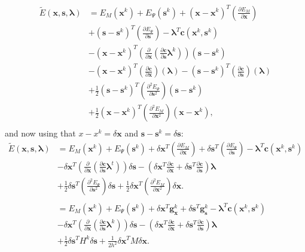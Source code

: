 \documentclass[letterpaper,12pt]{article}
\theoremstyle{remark}
\newcommand{\x}{\mathbf{x}}
\newcommand{\C}{\mathbf{c}}
\newcommand{\s}{\mathbf{s}}
\newcommand{\la}{\mathbf{\lambda}}
\newcommand{\dx}{\delta \x}
\newcommand{\ds}{\delta \s}
\newcommand{\gx}{ {\mathbf{g}_\x^k} }
\newcommand{\gs}{ {\mathbf{g}_\s^k} }
\begin{document}
\begin{equation}
\begin{split}
\tilde{E}(\x,\s,\la) &=  E_M(\x^k) + E_\Psi(\s^k) + 
(\x - \x^k)^T \left(\frac{\partial E_M}{\partial \x} \right)  \\
&+ (\s - \s^k)^T \left(\frac{\partial E_\Psi}{\partial \s} \right)   
 - \la^T \C (\x^k, \s^k) \\
& - (\x - \x^k)^T \left(
  \frac{\partial}{\partial \x} \left(\frac{\partial \C}{\partial \s} \la^k\right) \right)(\s - \s^k) \\
& - (\x - \x^k)^T \left(
  \frac{\partial \C }{\partial \x} \right)(\la) 
- (\s - \s^k)^T \left(
  \frac{\partial \C }{\partial \s} \right)(\la) \\
& + \frac{1}{2}(\s- \s^k)^T \left(\frac{\partial^2 E_\Psi}{\partial \s^2} \right)(\s - \s^k) \\
& + \frac{1}{2}(\x- \x^k)^T \left(\frac{\partial^2 E_M}{\partial \x^2}
\right)(\x - \x^k), \\
\end{split}
\end{equation}
and now using that $x - x^k = \dx$ and $\s - \s^k = \ds$:
\begin{equation}
\begin{split}
\tilde{E}(\x,\s,\la) &=  E_M(\x^k) + E_\Psi(\s^k) + 
\dx^T \left(\frac{\partial E_M}{\partial \x} \right) 
+ \ds^T \left(\frac{\partial E_\Psi}{\partial \s} \right)   
 - \la^T \C (\x^k, \s^k) \\
& - \dx^T \left(
  \frac{\partial}{\partial \x} \left(\frac{\partial \C}{\partial \s} \la^t\right) \right)\ds
- \left( \dx^T 
  \frac{\partial \C }{\partial \x}
+  \ds^T  
  \frac{\partial \C }{\partial \s} \right) \la \\
&+ \frac{1}{2}\ds^T \left(\frac{\partial^2 E_\Psi}{\partial \s^2} \right)\ds
+ \frac{1}{2} \dx^T \left(\frac{\partial^2 E_M}{\partial \x^2}
\right)\dx. \\
&\\
&=  E_M(\x^k) + E_\Psi(\s^k) + 
\dx^T \gx
+ \ds^T \gs
 - \la^T \C (\x^k, \s^k) \\
& - \dx^T \left(
  \frac{\partial}{\partial \x} \left(\frac{\partial \C}{\partial \s} \la^k\right) \right)\ds
- \left( \dx^T 
  \frac{\partial \C }{\partial \x}
+  \ds^T  
  \frac{\partial \C }{\partial \s} \right) \la \\
& + \frac{1}{2}\ds^T H^k \ds
+ \frac{1}{2h^2} \dx^T M \dx. \\
\end{split}
\end{equation}
\end{document}
